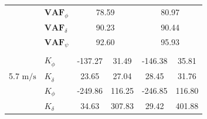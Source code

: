 \begin{table}[]
\begin{tabular}{llcccc}
                                                   & $\mathbf{VAF}_\phi$                                              & \multicolumn{2}{c}{78.59}                                                                          & \multicolumn{2}{c}{80.97}                                                                          \\
                                                   & $\mathbf{VAF}_\delta$                                            & \multicolumn{2}{c}{90.23}                                                                          & \multicolumn{2}{c}{90.44}                                                                          \\
                                                   & $\mathbf{VAF}_\psi$                                              & \multicolumn{2}{c}{92.60}                                                                          & \multicolumn{2}{c}{95.93}                                                                          \\
                                                   &                                                                  & \multicolumn{1}{l}{}                        & \multicolumn{1}{l}{}                                 & \multicolumn{1}{l}{}                        & \multicolumn{1}{l}{}                                 \\ \hline
                                                   & $K_{\dot{\phi}} $                                                & -137.27                                     & 31.49                                                & -146.38                                     & 35.81                                                \\
    \multirow{-2}{*}{5.7 $\si{\meter\per\second}$} & $K_{\dot{\delta}}$                                               & 23.65                                       & 27.04                                                & 28.45                                       & 31.76                                                \\
                                                   & $K_{\phi} $                                                      & -249.86                                     & 116.25                                               & -246.85                                     & 116.80                                               \\
                                                   & $K_\delta $                                                      & 34.63                                       & 307.83                                               & 29.42                                       & 401.88                                               \\

\end{tabular}
\end{table}
